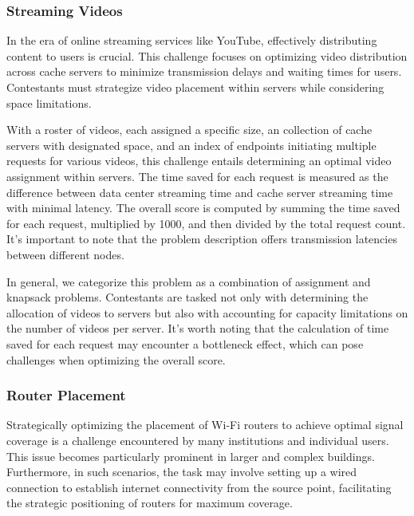 \subsubsection*{Streaming Videos}
\label{subsubsec:hashcode-2017-qualification}

In the era of online streaming services like YouTube, effectively distributing
content to users is crucial. This challenge focuses on optimizing video
distribution across cache servers to minimize transmission delays and waiting
times for users. Contestants must strategize video placement within servers
while considering space limitations.

With a roster of videos, each assigned a specific size, an collection of cache
servers with designated space, and an index of endpoints initiating multiple
requests for various videos, this challenge entails determining an optimal
video assignment within servers. The time saved for each request is measured as the
difference between data center streaming time and cache server streaming time
with minimal latency. The overall score is computed by summing the time saved
for each request, multiplied by 1000, and then divided by the total request
count. It's important to note that the problem description offers transmission
latencies between different nodes.

In general, we categorize this problem as a combination of assignment and
knapsack problems. Contestants are tasked not only with determining the
allocation of videos to servers but also with accounting for capacity
limitations on the number of videos per server. It's worth noting that the
calculation of time saved for each request may encounter a bottleneck effect,
which can pose challenges when optimizing the overall score.

\subsubsection*{Router Placement}
\label{subsubsec:hashcode-2017-final}

Strategically optimizing the placement of Wi-Fi routers to achieve optimal
signal coverage is a challenge encountered by many institutions and individual
users. This issue becomes particularly prominent in larger and complex
buildings. Furthermore, in such scenarios, the task may involve setting up a wired
connection to establish internet connectivity from the source point,
facilitating the strategic positioning of routers for maximum coverage.

